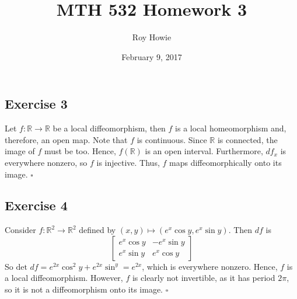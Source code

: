 \documentclass{article}
\newcommand{\R}{\mathbb{R}}
\begin{document}
\title{MTH 532 Homework 3}
\author{Roy Howie}
\date{February 9, 2017}
\maketitle

\subsection*{Exercise 3}
Let $f\colon\R\to\R$ be a local diffeomorphism, then
$f$ is a local homeomorphism and, therefore, an open map.
Note that $f$ is continuous.  Since $\R$ is connected,
the image of $f$ must be too. Hence, $f(\R)$ is an open interval.
Furthermore, $df_x$ is everywhere nonzero, so $f$ is injective.
Thus, $f$ maps diffeomorphically onto its image.
\hfill $\square$

\subsection*{Exercise 4}
Consider $f\colon\R^2\to\R^2$ defined by
$(x,y)\mapsto(e^x\cos y, e^x\sin y)$. Then $df$ is
\begin{equation*}
\begin{bmatrix}
	e^x\cos y	& -e^x\sin y\\
	e^x\sin y	& e^x\cos y
\end{bmatrix}
\end{equation*}
So $\text{det }df = e^{2x}\cos^2y+e^{2x}\sin^y=e^{2x}$, which
is everywhere nonzero. Hence, $f$ is a local diffeomorphism.
However, $f$ is clearly not invertible, as it has period $2\pi$,
so it is not a diffeomorphism onto its image.
\hfill $\square$
\end{document}
